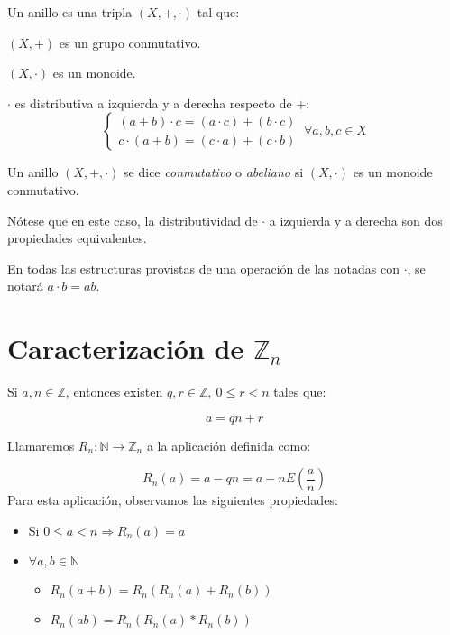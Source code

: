 \begin{ndef}[Anillo]

  Un anillo es una tripla $(X, +, \cdot)$ tal que:

  \begin{nlist}
  \item $(X, +)$ es un grupo conmutativo.
  \item $(X, \cdot)$ es un monoide.
  \item $\cdot$ es distributiva a izquierda y a derecha respecto de $+$:
    \[
    \begin{cases}
      (a + b) \cdot c = (a \cdot c) + (b \cdot c)\\
      c \cdot (a + b) = (c \cdot a) + (c \cdot b)
    \end{cases} \ \forall a,b,c \in X
    \]

  \end{nlist}

\end{ndef}

\begin{ndef}
  Un anillo $(X, +, \cdot)$ se dice \emph{conmutativo} o \emph{abeliano} si $(X, \cdot)$ es un monoide conmutativo.
\end{ndef}

Nótese que en este caso, la distributividad de $\cdot$ a izquierda y a derecha son dos propiedades equivalentes.

\begin{nota}
  En todas las estructuras provistas de una operación de las notadas con $\cdot$, se notará $a \cdot b = ab$.
\end{nota}


\section*{Caracterización de $\mathbb{Z}_{n}$}

Si $a,n\in \mathbb{Z}$, entonces existen $q,r \in \mathbb{Z},\ 0 \le r < n$ tales que:

\[
    a = qn + r
\]

Llamaremos $R_n:\mathbb{N} \rightarrow \mathbb{Z}_n$ a la aplicación definida como:

\[
R_n(a) = a - qn = a- nE\left(\frac{a}{n}\right)
\]
Para esta aplicación, observamos las siguientes propiedades:

\begin{itemize}
\item Si $0 \leq a < n  \Rightarrow R_n(a) = a$
\item $\forall a,b \in \mathbb{N}$

\begin{itemize}
	\item  $R_n(a+b) = R_n(R_n(a) + R_n(b))$
	\item $R_n(ab) = R_n(R_n(a)*R_n(b))$
\end{itemize}

\end{itemize}


